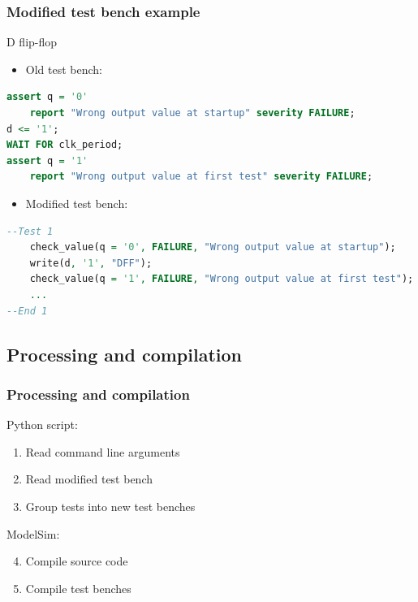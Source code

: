\documentclass[british,10pt]{beamer}
\begin{document}
\begin{frame}[fragile]\frametitle{Modified test bench example}
D flip-flop
\begin{itemize}
\item Old test bench:
\end{itemize}
\begin{lstlisting}[language=VHDL, tabsize=4, frame=single, framesep=2mm, belowskip=5pt, aboveskip=5pt, showstringspaces=false, basicstyle=\scriptsize]
assert q = '0'
    report "Wrong output value at startup" severity FAILURE;
d <= '1';
WAIT FOR clk_period;
assert q = '1'
    report "Wrong output value at first test" severity FAILURE;
\end{lstlisting}
\vskip1pt
\begin{itemize}
\item Modified test bench:
\end{itemize}
\begin{lstlisting}[language=VHDL, tabsize=4, frame=single, framesep=2mm, belowskip=5pt, aboveskip=5pt, showstringspaces=false, basicstyle=\scriptsize]
--Test 1
    check_value(q = '0', FAILURE, "Wrong output value at startup");
    write(d, '1', "DFF");
    check_value(q = '1', FAILURE, "Wrong output value at first test");
    ...
--End 1
\end{lstlisting}
\end{frame}

\subsection{Processing and compilation}
\begin{frame}\frametitle{Processing and compilation}
Python script:
\begin{enumerate}
\item Read command line arguments
\item Read modified test bench
\item Group tests into new test benches
\end{enumerate}
ModelSim:
\begin{enumerate}
\setcounter{enumi}{3}
\item Compile source code
\item Compile test benches
\end{enumerate}
\end{frame}
\end{document}
